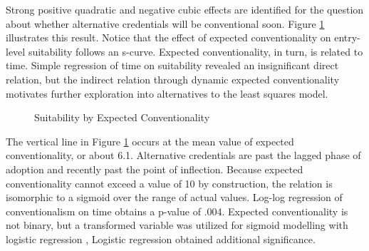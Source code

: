 \documentclass[AER]{./aea-latex-templates/AEA}
\begin{document}
        Strong positive quadratic and negative cubic effects are identified for
        the question about whether alternative credentials will be conventional soon.
        Figure \ref{fig:expect_convention_voi} illustrates this result. Notice that the effect of expected conventionality on entry-level suitability follows an s-curve.
        Expected conventionality, in turn, is related to time.
        Simple regression of time on suitability revealed an insignificant direct relation,
        but the indirect relation through dynamic expected conventionality motivates further exploration into alternatives to the least squares model.
        
        \begin{figure}[h!]
            \centering
            \caption{Suitability by Expected Conventionality}
            
        
            \label{fig:expect_convention_voi}
            \end{figure}
        
        The vertical line in Figure \ref{fig:expect_convention_voi} occurs at the mean value of expected conventionality, or about 6.1.
        Alternative credentials are past the lagged phase of adoption and recently past the
        point of inflection. Because expected conventionality cannot exceed a value of 10 by
        construction, the relation is isomorphic to a sigmoid over the range of actual values.
        Log-log regression of conventionalism on time obtains a p-value of .004.
        Expected conventionality is not binary,
        but a transformed variable was utilized for sigmoid modelling with logistic regression \cite{cox2008stata},
        Logistic regression obtained additional significance.
        
\end{document}
